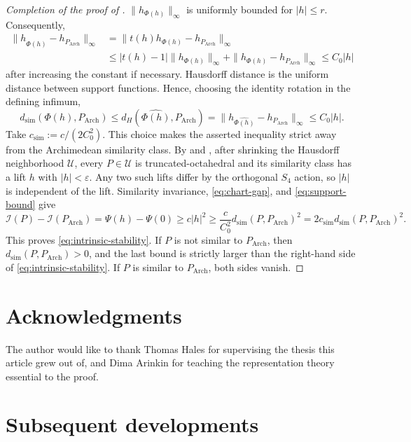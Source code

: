 \documentclass[11pt]{article}
\newcommand{\Arch}{P_{\mathrm{Arch}}}
\newcommand{\Ical}{\mathcal I}
\theoremstyle{remark}
\begin{document}
\begin{proof}[Completion of the proof of ]
$\|h_{\Phi(h)}\|_\infty$ is uniformly bounded for $|h|\leq r$.
Consequently,
\[
\begin{aligned}
 \|h_{\widehat{\Phi(h)}}-h_{\Arch}\|_\infty
 &=
 \|t(h)h_{\Phi(h)}-h_{\Arch}\|_\infty                         \\
 &\leq
 |t(h)-1|\|h_{\Phi(h)}\|_\infty
 +\|h_{\Phi(h)}-h_{\Arch}\|_\infty              \leq C_0|h|
\end{aligned}
\]
after increasing the constant if necessary.  Hausdorff distance is the
uniform distance between support functions.  Hence, choosing the identity
rotation in the defining infimum,
\begin{equation}\label{eq:support-bound}
 d_{\mathrm{sim}}(\Phi(h),\Arch)
 \leq d_H(\widehat{\Phi(h)},\Arch)
 =\|h_{\widehat{\Phi(h)}}-h_{\Arch}\|_\infty
 \leq C_0|h|.
\end{equation}  
Take $c_{\mathrm{sim}}:=c/(2C_0^2)$. 
This choice makes the asserted inequality strict away from the Archimedean similarity class.  
By  and , after shrinking the Hausdorff neighborhood
$\mathcal U$, every $P\in\mathcal U$ is truncated-octahedral and its similarity class has
a lift $h$ with $|h|<\varepsilon$.  Any two such lifts differ by the orthogonal $S_4$
action, so $|h|$ is independent of the lift.  Similarity
invariance, \eqref{eq:chart-gap}, and \eqref{eq:support-bound} give
\[
 \Ical(P)-\Ical(\Arch)=\Psi(h)-\Psi(0)
 \geq c|h|^2
 \geq \frac{c}{C_0^2}d_{\mathrm{sim}}(P,\Arch)^2
 =2c_{\mathrm{sim}}d_{\mathrm{sim}}(P,\Arch)^2.
\]
This proves \eqref{eq:intrinsic-stability}.  If $P$ is not similar to $\Arch$, then
$d_{\mathrm{sim}}(P,\Arch)>0$, and the last bound is strictly larger than the right-hand
side of \eqref{eq:intrinsic-stability}.  If $P$ is similar to $\Arch$, both sides vanish.
\end{proof}


\section*{Acknowledgments}

The author would like to thank Thomas Hales for supervising the thesis this article grew out of, and Dima Arinkin for teaching the representation theory essential to the proof.



\section*{Subsequent developments}
\end{document}
